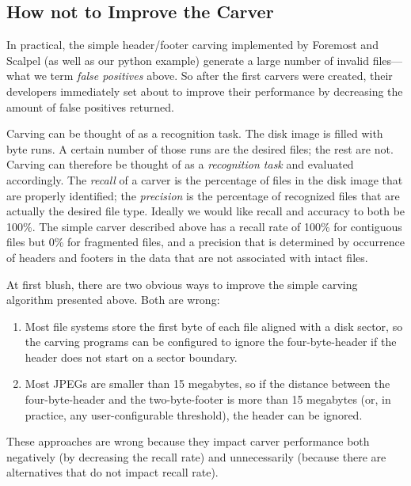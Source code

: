 \documentclass[11pt,letter]{article}
\begin{document}
\subsection{How not to Improve the Carver}
In practical, the simple header/footer carving implemented by Foremost
and Scalpel (as well as our python example) generate a large number of
invalid files---what we term \emph{false positives} above. So after
the first carvers were created, their developers immediately set about
to improve their performance by decreasing the amount of false
positives returned.

Carving can be thought of as a recognition task. The disk image is
filled with byte runs. A certain number of those runs are the desired
files; the rest are not. Carving can therefore be thought of as a
\emph{recognition task} and evaluated accordingly. The \emph{recall}
of a carver is the percentage of files in the disk image that are
properly identified; the \emph{precision}  is the percentage of
recognized files that are actually the desired file type. Ideally we
would like recall and accuracy to both be 100\%. The simple carver
described above has a recall rate of 100\% for contiguous files but
0\% for fragmented files, and a precision that is determined by
occurrence of headers and footers in the data that are not associated
with intact files.

At first blush, there are two obvious ways to improve the simple carving
algorithm presented above. Both are wrong:

\begin{enumerate}
\item Most file systems store the first byte of
each file aligned with a disk sector, so the carving programs can be
configured to ignore the four-byte-header if the header does not start on a
sector boundary.

\item Most JPEGs are smaller than 15 megabytes, so if the
distance between the four-byte-header and the two-byte-footer is more
than 15 megabytes (or, in practice, any user-configurable threshold),
the header can be ignored. 

\end{enumerate}

These approaches are wrong because they impact carver
performance both negatively (by decreasing the recall rate) and
unnecessarily (because there are alternatives that do not impact
recall rate).
\end{document}
